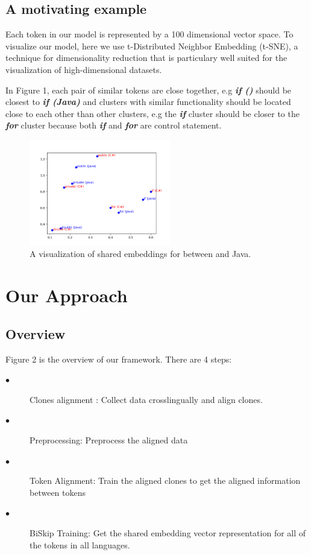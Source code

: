 \subsection{A motivating example}
Each token in our model is represented by a 100 dimensional vector space. To visualize our model, here we use t-Distributed Neighbor Embedding (t-SNE), a technique for dimensionality reduction that is particulary well suited for the visualization of high-dimensional datasets. 

In Figure 1, each pair of similar tokens are close together, e.g \textit{\textbf{if ()}} should be closest to \textit{\textbf{if (Java)}} and clusters with similar functionality should be located close to each other than other clusters, e.g the \textit{\textbf{if}} cluster should be closer to the \textit{\textbf{for}} cluster because both \textit{\textbf{if}} and \textit{\textbf{for}} are control statement.

\begin{figure}[t!]
	\includegraphics[width=0.55\textwidth]{example_bi2vec_tsne}
	\caption{A visualization of shared embeddings for between  and Java.}
	\label{fig:clf}
\end{figure}

\section{Our Approach}
\subsection{Overview}
Figure 2 is the overview of our framework. There are 4 steps:
\begin{description}
	\item [$\bullet$] Clones alignment : Collect data crosslingually and align clones.
	\item [$\bullet$] Preprocessing: Preprocess the aligned data
	\item [$\bullet$] Token Alignment: Train the aligned clones to get the aligned information between tokens
	\item [$\bullet$] BiSkip Training: Get the shared embedding vector representation for all of the tokens in all languages.
\end{description}

